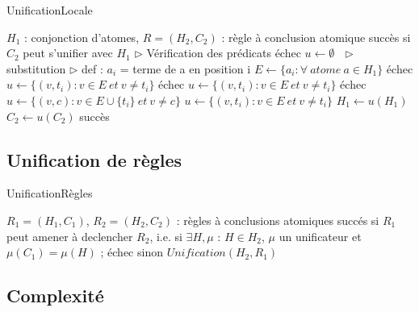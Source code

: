 \begin{center}
\begin{algorithm}[H]
\caption{UnificationLocale}\label{unification_locale}
\begin{algorithmic}[1]
\REQUIRE $H_{1}$ : conjonction d'atomes, $R = (H_{2},C_{2})$ : r\`egle \`a conclusion atomique 
\ENSURE succ\`es si $C_{2}$ peut s'unifier avec $H_{1}$ 
\STATE $\triangleright$ V\'erification des pr\'edicats
		\RETURN \'echec
	\ENDIF
\ENDFOR
\STATE $u \leftarrow \emptyset\ \ \ \triangleright$ substitution 
	\STATE $\triangleright$ def : $a_{i}$ = terme de a en position i
	\STATE $E \leftarrow \{a_{i} : \forall\ atome\ a \in H_{1}\}$
			\RETURN \'echec
		\ELSE
			\STATE $u \leftarrow \{(v,t_{i}) : v \in E\ et\ v \neq t_{i}\}$
		\ENDIF
			\RETURN \'echec
		\ELSE
			\STATE $u \leftarrow \{(v,t_{i}) : v \in E\ et\ v \neq t_{i}\}$
		\ENDIF
	\ELSE
			\RETURN \'echec
			\STATE $u \leftarrow \{(v,c) : v \in E \cup \{t_{i}\}\ et\ v \neq c\}$
		\ELSE
			\STATE $u \leftarrow \{(v,t_{i}) : v \in E\ et\ v \neq t_{i}\}$
		\ENDIF
	\ENDIF	
	\STATE $H_{1} \leftarrow u(H_{1})$
	\STATE $C_{2} \leftarrow u(C_{2})$
\ENDFOR
\RETURN succ\`es 

\end{algorithmic}
\end{algorithm}
\end{center}

\subsection{Unification de r\`egles}
\begin{center}
\begin{algorithm}[H]
\caption{UnificationR\`egles}\label{unification_regles}
\begin{algorithmic}[1]
\REQUIRE $R_{1} = (H_{1},C_{1})$, $R_{2} = (H_{2},C_{2})$ : r\`egles \`a conclusions atomiques
\ENSURE succ\'es si $R_{1}$ peut amener \`a declencher $R_{2}$, i.e. si $\exists H,\mu$ :  $H \in H_{2}$, $\mu$ un unificateur et $\mu(C_{1}) = \mu(H)$ ; \'echec sinon
\RETURN $Unification(H_{2}, R_{1})$
\end{algorithmic}
\end{algorithm}
\end{center}

\subsection{Complexit\'e}

